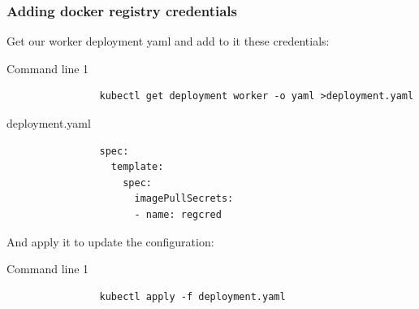 	\begin{frame}[fragile]
		\frametitle{Adding docker registry credentials}
		
		Get our worker deployment yaml and add to it these credentials:
		\begin{block}{Command line 1}
			\begin{verbatim}
				kubectl get deployment worker -o yaml >deployment.yaml
			\end{verbatim}
		\end{block}
		\begin{block}{deployment.yaml}
			\begin{verbatim}
				spec:
				  template:
				    spec:
				      imagePullSecrets:
				      - name: regcred
			\end{verbatim}
		\end{block}
		
		And apply it to update the configuration:
		\begin{block}{Command line 1}
			\begin{verbatim}
				kubectl apply -f deployment.yaml
			\end{verbatim}
		\end{block}
	\end{frame}
